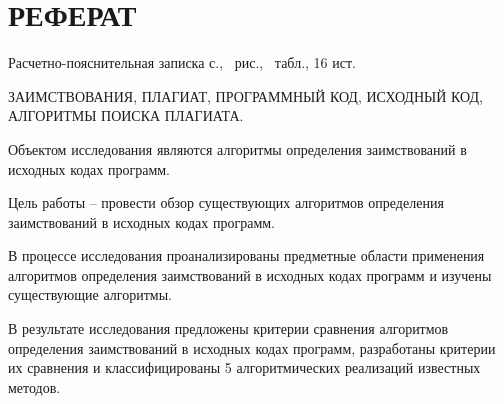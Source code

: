 \section*{РЕФЕРАТ}

Расчетно-пояснительная записка \pageref{LastPage} с., \totalfigures\ рис., \totaltables\ табл., 16 ист.

ЗАИМСТВОВАНИЯ, ПЛАГИАТ, ПРОГРАММНЫЙ КОД, ИСХОДНЫЙ КОД, АЛГОРИТМЫ ПОИСКА ПЛАГИАТА.

Объектом исследования являются алгоритмы определения заимствований в исходных кодах программ. 

Цель работы -- провести обзор существующих алгоритмов определения заимствований в исходных кодах программ.

В процессе исследования проанализированы предметные области применения алгоритмов определения заимствований в исходных кодах программ и изучены существующие алгоритмы.

В результате исследования предложены критерии сравнения алгоритмов определения заимствований в исходных кодах программ, разработаны критерии их сравнения и классифицированы 5 алгоритмических реализаций известных методов.

\pagebreak
